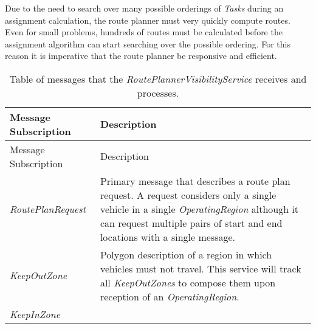Due to the need to search over many possible orderings of \emph{Tasks}
during an assignment calculation, the route planner must very quickly
compute routes. Even for small problems, hundreds of routes must be
calculated before the assignment algorithm can start searching over the
possible ordering. For this reason it is imperative that the route
planner be responsive and efficient.

\begin{longtable}[c]{@{}ll@{}}
\caption{Table of messages that the \emph{RoutePlannerVisibilityService}
receives and processes.}\tabularnewline
\toprule
\begin{minipage}[b]{0.29\columnwidth}\raggedright\strut
Message Subscription
\strut\end{minipage} &
\begin{minipage}[b]{0.65\columnwidth}\raggedright\strut
Description
\strut\end{minipage}\tabularnewline
\midrule
\endfirsthead
\toprule
\begin{minipage}[b]{0.29\columnwidth}\raggedright\strut
Message Subscription
\strut\end{minipage} &
\begin{minipage}[b]{0.65\columnwidth}\raggedright\strut
Description
\strut\end{minipage}\tabularnewline
\midrule
\endhead
\begin{minipage}[t]{0.29\columnwidth}\raggedright\strut
\emph{RoutePlanRequest}
\strut\end{minipage} &
\begin{minipage}[t]{0.65\columnwidth}\raggedright\strut
Primary message that describes a route plan request. A request considers
only a single vehicle in a single \emph{OperatingRegion} although it can
request multiple pairs of start and end locations with a single message.
\strut\end{minipage}\tabularnewline
\begin{minipage}[t]{0.29\columnwidth}\raggedright\strut
\emph{KeepOutZone}
\strut\end{minipage} &
\begin{minipage}[t]{0.65\columnwidth}\raggedright\strut
Polygon description of a region in which vehicles must not travel. This
service will track all \emph{KeepOutZones} to compose them upon
reception of an \emph{OperatingRegion}.
\strut\end{minipage}\tabularnewline
\begin{minipage}[t]{0.29\columnwidth}\raggedright\strut
\emph{KeepInZone}

\end{minipage}
\end{longtable}
